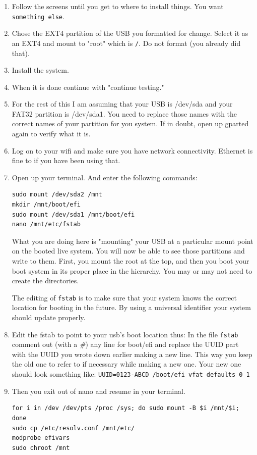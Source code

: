 \documentclass{article}
\begin{document}
\begin{enumerate}
\item Follow the screens until you get to where to install things. You want \texttt{something else}.
\item Chose the EXT4 partition of the USB you formatted for change. Select it as an EXT4 and mount to "root" which is \texttt{/}. Do not format (you already did that).
\item Install the system.
\item When it is done continue with "continue testing."
\item For the rest of this I am assuming that your USB is /dev/sda and your FAT32 partition is /dev/sda1. You need to replace those names with the correct names of your partition for you system. If in doubt, open up gparted again to verify what it is.
\item Log on to your wifi and make sure you have network connectivity. Ethernet is fine to if you have been using that.
\item Open up your terminal. And enter the following commands:
\begin{verbatim}
sudo mount /dev/sda2 /mnt
mkdir /mnt/boot/efi
sudo mount /dev/sda1 /mnt/boot/efi
nano /mnt/etc/fstab
\end{verbatim}
What you are doing here is "mounting" your USB at a particular mount point on the booted live system. You will now be able to see those partitions and write to them. First, you mount the root at the top, and then you boot your boot system in its proper place in the hierarchy. You may or may not need to create the directories. 

The editing of \texttt{fstab} is to make sure that your system knows the correct location for booting in the future. By using a universal identifier your system should update properly.
\item Edit the fstab to point to your usb's boot location thus:
In the file \texttt{fstab} comment out (with a \emph{\#}) any line for boot/efi and replace the UUID part with the UUID you wrote down earlier making a new line. This way you keep the old one to refer to if necessary while making a new one.
Your new one should look something like: \texttt{UUID=0123-ABCD /boot/efi vfat defaults 0 1}
\item Then you exit out of nano and resume in your terminal.
\begin{verbatim}
for i in /dev /dev/pts /proc /sys; do sudo mount -B $i /mnt/$i; done
sudo cp /etc/resolv.conf /mnt/etc/
modprobe efivars
sudo chroot /mnt
\end{verbatim}


\end{enumerate}
\end{document}
